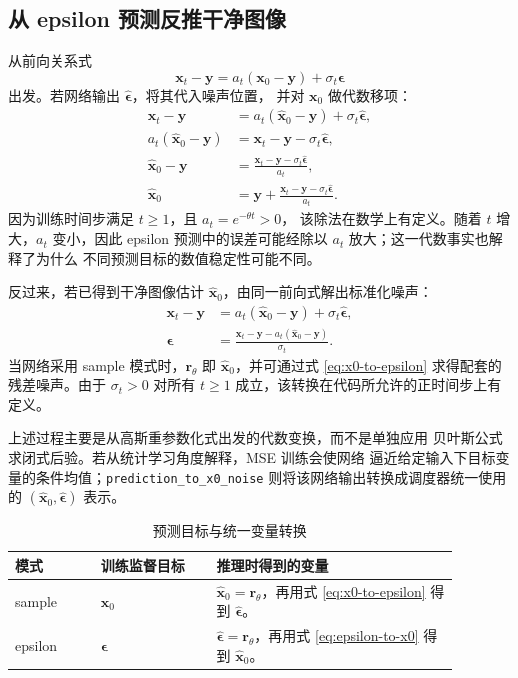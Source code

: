 \documentclass[UTF8,a4paper,12pt]{ctexart}
\begin{document}
\subsection{从 epsilon 预测反推干净图像}

从前向关系式
\[
  \bm{x}_t-\bm{y}
  =a_t(\bm{x}_0-\bm{y})+\sigma_t\bm{\epsilon}
\]
出发。若网络输出 \(\widehat{\bm{\epsilon}}\)，将其代入噪声位置，
并对 \(\bm{x}_0\) 做代数移项：
\begin{align}
  \bm{x}_t-\bm{y}
  &=a_t(\widehat{\bm{x}}_0-\bm{y})
    +\sigma_t\widehat{\bm{\epsilon}},
  \\
  a_t(\widehat{\bm{x}}_0-\bm{y})
  &=\bm{x}_t-\bm{y}
    -\sigma_t\widehat{\bm{\epsilon}},
  \\
  \widehat{\bm{x}}_0-\bm{y}
  &=\frac{
      \bm{x}_t-\bm{y}-\sigma_t\widehat{\bm{\epsilon}}
    }{a_t},
  \\
  \widehat{\bm{x}}_0
  &=\bm{y}
    +\frac{
      \bm{x}_t-\bm{y}-\sigma_t\widehat{\bm{\epsilon}}
    }{a_t}.
  \label{eq:epsilon-to-x0}
\end{align}
因为训练时间步满足 \(t\geq 1\)，且 \(a_t=e^{-\theta t}>0\)，
该除法在数学上有定义。随着 \(t\) 增大，\(a_t\) 变小，因此 epsilon
预测中的误差可能经除以 \(a_t\) 放大；这一代数事实也解释了为什么
不同预测目标的数值稳定性可能不同。

反过来，若已得到干净图像估计
\(\widehat{\bm{x}}_0\)，由同一前向式解出标准化噪声：
\begin{align}
  \bm{x}_t-\bm{y}
  &=a_t(\widehat{\bm{x}}_0-\bm{y})
    +\sigma_t\widehat{\bm{\epsilon}},
  \\
  \widehat{\bm{\epsilon}}
  &=\frac{
     \bm{x}_t-\bm{y}-a_t(\widehat{\bm{x}}_0-\bm{y})
    }{\sigma_t}.
  \label{eq:x0-to-epsilon}
\end{align}
当网络采用 sample 模式时，\(\bm{r}_\theta\) 即
\(\widehat{\bm{x}}_0\)，并可通过式 \eqref{eq:x0-to-epsilon}
求得配套的残差噪声。由于 \(\sigma_t>0\) 对所有 \(t\geq1\)
成立，该转换在代码所允许的正时间步上有定义。

上述过程主要是从高斯重参数化式出发的代数变换，而不是单独应用
贝叶斯公式求闭式后验。若从统计学习角度解释，MSE 训练会使网络
逼近给定输入下目标变量的条件均值；\texttt{prediction\_to\_x0\_noise}
则将该网络输出转换成调度器统一使用的
\((\widehat{\bm{x}}_0,\widehat{\bm{\epsilon}})\) 表示。

\begin{table}[htbp]
\centering
\caption{预测目标与统一变量转换}
\label{tab:prediction}
\begin{tabular}{p{0.17\linewidth}p{0.23\linewidth}p{0.48\linewidth}}
\toprule
模式 & 训练监督目标 & 推理时得到的变量 \\
\midrule
sample
& \(\bm{x}_0\)
& \(\widehat{\bm{x}}_0=\bm{r}_\theta\)，再用式
  \eqref{eq:x0-to-epsilon} 得到
  \(\widehat{\bm{\epsilon}}\)。 \\
epsilon
& \(\bm{\epsilon}\)
& \(\widehat{\bm{\epsilon}}=\bm{r}_\theta\)，再用式
  \eqref{eq:epsilon-to-x0} 得到
  \(\widehat{\bm{x}}_0\)。 \\
\bottomrule
\end{tabular}
\end{table}
\end{document}
